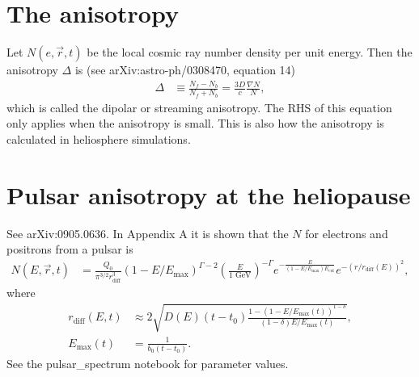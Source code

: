 \documentclass[11pt]{article}
\renewcommand\u[1]{\text{#1}} %
\newcommand{\us}[1]{\text{ #1}} %
\begin{document}
\section{The anisotropy}

Let $N(e, \vec{r}, t)$ be the local cosmic ray number density per unit energy.  Then the anisotropy $\Delta$ is (see arXiv:astro-ph/0308470, equation 14)
\begin{align*}
    \Delta &\equiv \frac{N_f - N_b}{N_f + N_b} = \frac{3 D}{c} \frac{\nabla N}{N},
\end{align*}
which is called the dipolar or streaming anisotropy.  The RHS of this equation only applies when the anisotropy is small.  This is also how the anisotropy is calculated in heliosphere simulations.

\section{Pulsar anisotropy at the heliopause}

See arXiv:0905.0636.  In Appendix A it is shown that the $N$ for electrons and positrons from a pulsar is
\begin{align*}
    N(E, \vec{r}, t) &= \frac{Q_0}{\pi^{3/2} r_{\u{diff}}^3} (1 - E / E_{\u{max}})^{\Gamma - 2} \left( \frac{E}{1\us{GeV}} \right)^{-\Gamma} e^{-\frac{E}{(1 - E / E_{\u{max}}) E_{\u{cut}}}} e^{-(r / r_{\u{diff}}(E))^2},
\end{align*}
where
\begin{align*}
    r_{\u{diff}} (E, t) &\approx 2\sqrt{D(E) (t - t_0) \frac{1 - (1 - E / E_{\u{max}}(t))^{1 - \delta}}{(1 - \delta) E / E_{\u{max}}(t)}},\\
    E_{\u{max}}(t) &= \frac{1}{b_0(t - t_0)}.
\end{align*}
See the pulsar\_spectrum notebook for parameter values.
\end{document}
